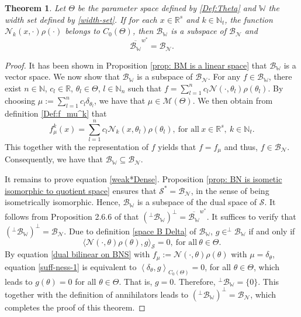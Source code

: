 \documentclass[11pt]{article}
\newtheorem{theorem}{Theorem}
\begin{document}
\begin{theorem}\label{theorem: H is linear subspace}
Let $\Theta$ be the parameter space defined by \eqref{Def:Theta} and  $\mathbb{W}$ the width set defined by \eqref{width-set}. If for each $x\in \mathbb{R}^s$ and $k\in\mathbb{N}_t$, the function $\mathcal{N}_k({x},\cdot)\rho(\cdot)$ belongs to $C_0(\Theta)$, then $\mathcal{B}_{\mathbb{W}}$ is a subspace of $\mathcal{B}_{\mathcal{N}}$ and  
\begin{equation}\label{weak*Dense}
\overline{\mathcal{B}_{\mathbb{W}}}^{w^*}=\mathcal{B}_{\mathcal{N}}.
\end{equation}
\end{theorem}
\begin{proof}
It has been shown in Proposition \ref{prop: BM is a linear space} that $\mathcal{B}_{\mathbb{W}}$ is a vector space. We now show that $\mathcal{B}_{\mathbb{W}}$ is a subspace of $\mathcal{B}_{\mathcal{N}}$. For any $f\in{{{\mathcal{B}_{\mathbb{W}}}}}$, there exist $n\in\mathbb{N}$, $c_l\in\mathbb{R}$, $\theta_l\in\Theta$, $l\in\mathbb{N}_n$ such that $f=\sum_{l=1}^n c_l\mathcal{N}(\cdot,\theta_l)\rho(\theta_l)$. By choosing $\mu:=\sum_{l=1}^n c_l\delta_{\theta_l}$, we have that 
$\mu\in\mathcal{M}(\Theta)$. We then obtain from definition \eqref{Def:f_mu^k} that  
$$
f_{\mu}^k(x)=\sum_{l=1}^n c_l\mathcal{N}_k(x,\theta_l)\rho(\theta_l),\ \mbox{for all}\ x\in\mathbb{R}^s,\  k\in\mathbb{N}_t.
$$
This together with the representation of $f$ yields that $f=f_{\mu}$ and thus, $f\in\mathcal{B}_{\mathcal{N}}$. Consequently, we have that $\mathcal{B}_{\mathbb{W}}\subseteq\mathcal{B}_{\mathcal{N}}$.

It remains to prove equation \eqref{weak*Dense}. Proposition \ref{prop: BN is isometic isomorphic to quotient space} ensures that $\mathcal{S}^*=\mathcal{B}_{\mathcal{N}}$, in the sense of being isometrically isomorphic. Hence, $\mathcal{B}_{\mathbb{W}}$ is a subspace of the dual space of $\mathcal{S}$. It follows from Proposition 2.6.6 of \cite{megginson2012introduction} that $(^{\perp}\mathcal{B}_{\mathbb{W}})^{\perp}=\overline{\mathcal{B}_{\mathbb{W}}}^{w^*}$. It suffices to verify that $(^{\perp}\mathcal{B}_{\mathbb{W}})^{\perp}=\mathcal{B}_{\mathcal{N}}$. Due to definition \eqref{space B Delta} of $\mathcal{B}_{\mathbb{W}}$, $g\in  ^{\perp}\mathcal{B}_{\mathbb{W}}$ if and only if \begin{equation}\label{suff-ness-1}
    \langle \mathcal{N}(\cdot,\theta)\rho(\theta), g\rangle_{\mathcal{S}}=0,\ \mbox{for all}\ \theta\in\Theta.
\end{equation}
By equation \eqref{dual bilinear on BNS} with $f_{\mu}:=\mathcal{N}(\cdot,\theta)\rho(\theta)$ with $\mu=\delta_{\theta}$, equation \eqref{suff-ness-1} is equivalent to 
$\left<\delta_\theta, g\right>_{C_0(\Theta)}=0$, for all $\theta\in\Theta$,
which leads to $g(\theta)=0$ for all $\theta\in\Theta$. That is, $g=0$. Therefore, $^{\perp}\mathcal{B}_{\mathbb{W}}=\{0\}$. This together with the definition of annihilators leads to $(^{\perp}\mathcal{B}_{\mathbb{W}})^\perp=\mathcal{B}_{\mathcal{N}}$, which completes the proof of this theorem.
\end{proof}
\end{document}
